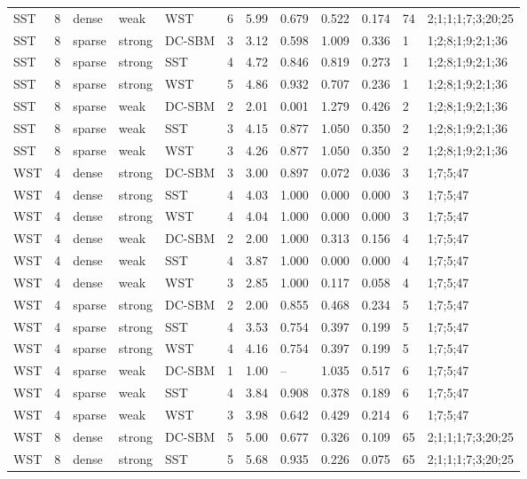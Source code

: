 \begin{table}[!h]
\begin{tabular}[t]{llllllllllll}
SST & 8 & dense & weak & WST & 6 & 5.99 & 0.679 & 0.522 & 0.174 & 74 & 2;1;1;1;7;3;20;25\\
SST & 8 & sparse & strong & DC-SBM & 3 & 3.12 & 0.598 & 1.009 & 0.336 & 1 & 1;2;8;1;9;2;1;36\\
SST & 8 & sparse & strong & SST & 4 & 4.72 & 0.846 & 0.819 & 0.273 & 1 & 1;2;8;1;9;2;1;36\\
SST & 8 & sparse & strong & WST & 5 & 4.86 & 0.932 & 0.707 & 0.236 & 1 & 1;2;8;1;9;2;1;36\\
SST & 8 & sparse & weak & DC-SBM & 2 & 2.01 & 0.001 & 1.279 & 0.426 & 2 & 1;2;8;1;9;2;1;36\\
SST & 8 & sparse & weak & SST & 3 & 4.15 & 0.877 & 1.050 & 0.350 & 2 & 1;2;8;1;9;2;1;36\\
SST & 8 & sparse & weak & WST & 3 & 4.26 & 0.877 & 1.050 & 0.350 & 2 & 1;2;8;1;9;2;1;36\\
WST & 4 & dense & strong & DC-SBM & 3 & 3.00 & 0.897 & 0.072 & 0.036 & 3 & 1;7;5;47\\
WST & 4 & dense & strong & SST & 4 & 4.03 & 1.000 & 0.000 & 0.000 & 3 & 1;7;5;47\\
WST & 4 & dense & strong & WST & 4 & 4.04 & 1.000 & 0.000 & 0.000 & 3 & 1;7;5;47\\
WST & 4 & dense & weak & DC-SBM & 2 & 2.00 & 1.000 & 0.313 & 0.156 & 4 & 1;7;5;47\\
WST & 4 & dense & weak & SST & 4 & 3.87 & 1.000 & 0.000 & 0.000 & 4 & 1;7;5;47\\
WST & 4 & dense & weak & WST & 3 & 2.85 & 1.000 & 0.117 & 0.058 & 4 & 1;7;5;47\\
WST & 4 & sparse & strong & DC-SBM & 2 & 2.00 & 0.855 & 0.468 & 0.234 & 5 & 1;7;5;47\\
WST & 4 & sparse & strong & SST & 4 & 3.53 & 0.754 & 0.397 & 0.199 & 5 & 1;7;5;47\\
WST & 4 & sparse & strong & WST & 4 & 4.16 & 0.754 & 0.397 & 0.199 & 5 & 1;7;5;47\\
WST & 4 & sparse & weak & DC-SBM & 1 & 1.00 & -- & 1.035 & 0.517 & 6 & 1;7;5;47\\
WST & 4 & sparse & weak & SST & 4 & 3.84 & 0.908 & 0.378 & 0.189 & 6 & 1;7;5;47\\
WST & 4 & sparse & weak & WST & 3 & 3.98 & 0.642 & 0.429 & 0.214 & 6 & 1;7;5;47\\
WST & 8 & dense & strong & DC-SBM & 5 & 5.00 & 0.677 & 0.326 & 0.109 & 65 & 2;1;1;1;7;3;20;25\\
WST & 8 & dense & strong & SST & 5 & 5.68 & 0.935 & 0.226 & 0.075 & 65 & 2;1;1;1;7;3;20;25\\

\end{tabular}
\end{table}
